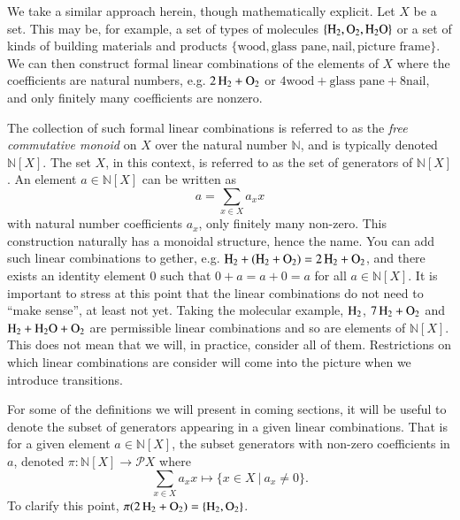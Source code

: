 \documentclass[aps,prd,onecolumn,nofootinbib,letterpaper,preprintnumbers,superscriptaddress,eqsecnum]{revtex4}
\theoremstyle{definition}
\newcommand{\N}{\mathbb{N}}
\newcommand{\powerset}{\mathcal{P}}
\begin{document}
We take a similar approach herein, though mathematically explicit. Let $X$ be a set. This may be, for example, a set of types of molecules $\{\ce{H_2}, \ce{O_2}, \ce{H_2O}\}$ or a set of kinds of building materials and products $\{\textrm{wood}, \textrm{glass pane}, \textrm{nail}, \textrm{picture frame}\}$.
We can then construct formal linear combinations of the elements of $X$ where the coefficients are natural numbers, e.g. $\ce{2H_2} + \ce{O_2}$ or $4\textrm{wood} + \textrm{glass pane} + 8\textrm{nail}$, and only finitely many coefficients are nonzero.

The collection of such formal linear combinations is referred to as the \textit{free commutative monoid} on $X$ over the natural number $\N$, and is typically denoted $\N[X]$.
The set $X$, in this context, is referred to as the set of generators of $\N[X]$.
An element $a \in \N[X]$ can be written as
\begin{equation*}
    a = \sum_{x \in X} a_x x
\end{equation*}
with natural number coefficients $a_x$, only finitely many non-zero.
This construction naturally has a monoidal structure, hence the name.
You can add such linear combinations to gether, e.g. $\ce{H_2} + (\ce{H_2} + \ce{O_2}) = \ce{2H_2} + \ce{O_2}$, and there exists an identity element $0$ such that $0 + a = a + 0 = a$ for all $a \in \N[X]$.
It is important to stress at this point that the linear combinations do not need to ``make sense'', at least not yet.
Taking the molecular example, $\ce{H_2}$, $\ce{7H_2} + \ce{O_2}$ and $\ce{H_2} + \ce{H_2O} + \ce{O_2}$ are permissible linear combinations and so are elements of $\N[X]$.
This does not mean that we will, in practice, consider all of them.
Restrictions on which linear combinations are consider will come into the picture when we introduce transitions.

For some of the definitions we will present in coming sections, it will be useful to denote the subset of generators appearing in a given linear combinations. That is for a given element $a \in \N[X]$, the subset generators with non-zero coefficients in $a$, denoted $\pi : \N[X] \rightarrow \powerset{X}$ where 
\begin{equation*}
    \displaystyle \sum_{x \in X} a_x x \mapsto \{ x \in X ~|~ a_x \ne 0 \}.
\end{equation*}
To clarify this point, $\pi(\ce{2H2} + \ce{O_2}) = \{\ce{H_2}, \ce{O_2}\}$.
\end{document}
